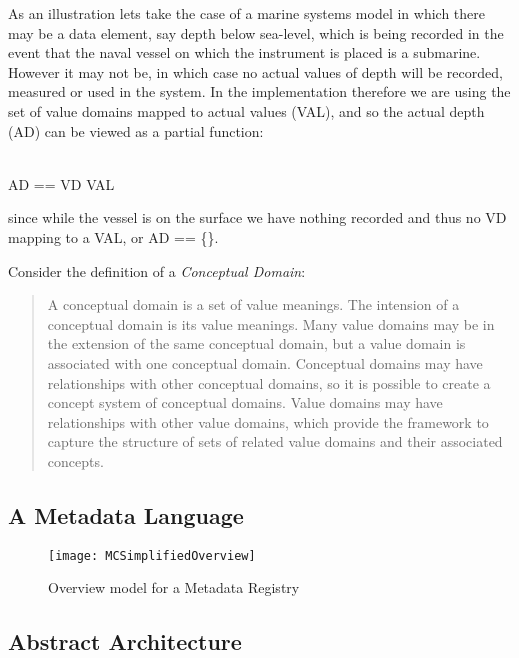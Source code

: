 As an illustration lets take the case of a marine systems model in which there may be a data element, say depth below sea-level, which is being recorded in the event that the naval vessel on which the instrument is placed is a submarine.  However it may not be, in which case no actual values of depth will be recorded, measured or used in the system. In the implementation therefore we are using the set of value domains mapped to actual values (VAL), and so the actual depth (AD) can be viewed as a partial function:
\vskip 4mm 
\begin{zed}
	[VAL]\\
	AD == VD \pfun VAL
\end{zed}
\vskip 4mm 
since while the vessel is on the surface we have nothing recorded and thus no VD mapping to a VAL, or AD == \{\}.  

Consider the definition of a \emph{Conceptual Domain}:
\begin{quote}
	A conceptual domain is a set of value meanings. The intension of a conceptual domain is its value meanings. Many value domains may be in the extension of the same conceptual domain, but a value domain is associated with one conceptual domain. Conceptual domains may have relationships with other conceptual domains, so it is possible to create a concept system of conceptual domains. Value domains may have relationships with other value domains, which provide the framework to capture the structure of sets of related value domains and their associated concepts.
	
\end{quote}


\subsection{A Metadata Language }

\begin{figure}[here]
	\texttt{[image: MCSimplifiedOverview]}
	\caption{Overview model for a Metadata Registry} 
	\label{fig:mcSimplifiedOverview}
\end{figure}




\subsection{Abstract Architecture}




